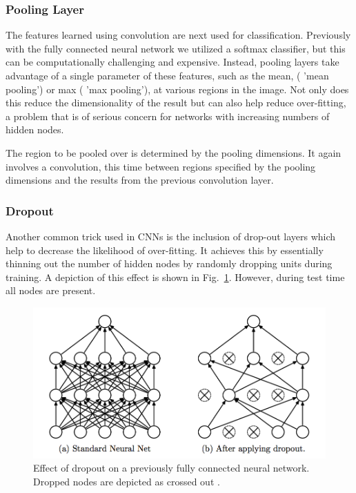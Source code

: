 \documentclass[12pt, twocolumn]{article}
\begin{document}
\subsubsection{Pooling Layer}
The features learned using convolution are next used for classification. Previously with the fully connected neural network we utilized a softmax classifier, but this can be computationally challenging and expensive. Instead, pooling layers take advantage of a single parameter of these features, such as the mean, ( 'mean pooling') or max ( 'max pooling'), at  various regions in the image. Not only does this reduce the dimensionality of the result but can also help reduce over-fitting, a problem that is of serious concern for networks with increasing numbers of hidden nodes. 

The region to be pooled over is determined by the pooling dimensions. It again involves a convolution, this time between regions specified by the pooling dimensions and the results from the previous convolution layer. 

\subsubsection{Dropout}

Another common trick used in CNNs is the inclusion of drop-out layers which help to decrease the likelihood of over-fitting. It achieves this by essentially thinning out the number of hidden nodes by randomly dropping units during training.  A depiction of this effect is shown in Fig.~\ref{fig:dropout}. However, during test time all nodes are present. 
\begin{figure}
\includegraphics[scale=.52]{dropout.png}

\caption{Effect of dropout on a previously fully connected neural network. Dropped nodes are depicted as crossed out \cite{Dropout}. }
\label{fig:dropout}
\end{figure}
\end{document}
